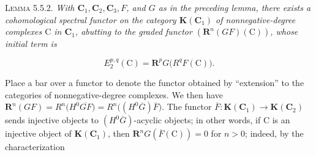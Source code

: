 \textsc{Lemma 5.5.2.} \textit{With ${\mathbf C}_1,{\mathbf C}_2,{\mathbf C}_3,F$, and $G$ as in
the preceding lemma, there exists a cohomological spectral functor on the
category $\mathbf K({\mathbf C}_1)$ of nonnegative-degree complexes $\mathrm C$ in ${\mathbf C}_1$, abutting
to the graded functor $({\mathbf R}^n(GF)(\mathrm C))$, whose initial term is}

\[
\tag{5.5.2}
E_2^{p,q}(\mathrm C)={\mathbf R}^pG\bigl(R^qF(\mathrm C)\bigr).
\]

Place a bar over a functor to denote the functor obtained by ``extension'' to
the categories of nonnegative-degree complexes. We then have
${\mathbf R}^n(GF)=R^n\bigl(H^0\overline{GF}\bigr)=R^n\bigl((H^0\overline G)\overline F\bigr)$.
The functor $\overline F:\mathbf K({\mathbf C}_1)\to\mathbf K({\mathbf C}_2)$ sends
injective objects to $(H^0\overline G)$-acyclic objects; in other words, if
$\mathrm C$ is an injective object of $\mathbf K({\mathbf C}_1)$, then
${\mathbf R}^nG(\overline F(\mathrm C))=0$ for $n>0$; indeed, by the characterization

